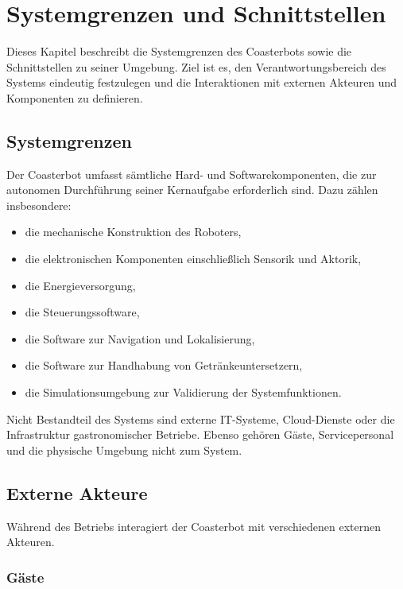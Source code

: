 \section{Systemgrenzen und
Schnittstellen}\label{systemgrenzen-und-schnittstellen}

Dieses Kapitel beschreibt die Systemgrenzen des Coasterbots sowie die
Schnittstellen zu seiner Umgebung. Ziel ist es, den
Verantwortungsbereich des Systems eindeutig festzulegen und die
Interaktionen mit externen Akteuren und Komponenten zu definieren.

\subsection{Systemgrenzen}\label{systemgrenzen}

Der Coasterbot umfasst sämtliche Hard- und Softwarekomponenten, die zur
autonomen Durchführung seiner Kernaufgabe erforderlich sind. Dazu zählen
insbesondere:

\begin{itemize}
\tightlist
\item
  die mechanische Konstruktion des Roboters,
\item
  die elektronischen Komponenten einschließlich Sensorik und Aktorik,
\item
  die Energieversorgung,
\item
  die Steuerungssoftware,
\item
  die Software zur Navigation und Lokalisierung,
\item
  die Software zur Handhabung von Getränkeuntersetzern,
\item
  die Simulationsumgebung zur Validierung der Systemfunktionen.
\end{itemize}

Nicht Bestandteil des Systems sind externe IT-Systeme, Cloud-Dienste
oder die Infrastruktur gastronomischer Betriebe. Ebenso gehören Gäste,
Servicepersonal und die physische Umgebung nicht zum System.

\subsection{Externe Akteure}\label{externe-akteure}

Während des Betriebs interagiert der Coasterbot mit verschiedenen
externen Akteuren.

\subsubsection{Gäste}\label{guxe4ste-1}

